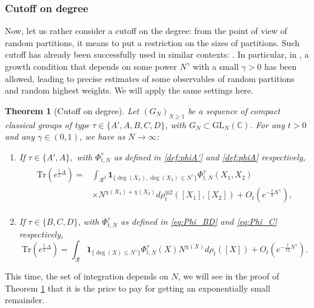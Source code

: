 \documentclass[11pt,a4paper,reqno]{article}
\newtheorem{theorem}{Theorem}[section]
\theoremstyle{definition}
\theoremstyle{remark}
\newcommand\GL{{\mathrm{GL}}}
\newcommand\C{\mathbb{C}}
\newcommand\Tr{\mathrm{Tr}}
\begin{document}
\subsubsection{Cutoff on degree}

Now, let us rather consider a cutoff on the degree: from the point of view of random partitions, it means to put a restriction on the sizes of partitions. Such cutoff has already been successfully used in similar contexts: \cite{Lem,Mag,Lem3}. In particular, in \cite{Lem,Lem3}, a growth condition that depends on some power $N^\gamma$ with a small $\gamma>0$ has been allowed, leading to precise estimates of some observables of random partitions and random highest weights. We will apply the same settings here.

\begin{theorem}[Cutoff on degree]\label{thm:main_alt}
Let $(G_N)_{N\geq 1}$ be a sequence of compact classical groups of type $\tau\in\{A',A,B,C,D\}$, with $G_N\subset\GL_N(\C)$. For any $t>0$ and any $\gamma\in(0,1)$, we have as $N\to\infty$:
\begin{enumerate}
\item If $\tau\in\{A',A\},$ with $\Phi_{t,N}^\tau$ as defined in \eqref{def:phiA'} and \eqref{def:phiA} respectively,
\begin{align}
\begin{split}
\Tr(e^{\frac{t}{2}\Delta}) = & \int_{\mathcal{R}^2}\mathbf{1}_{\{\deg(X_1),\deg(X_2)\leq N^\gamma\}}\Phi_{t,N}^\tau(X_1,X_2)\\
&\times N^{\chi(X_1)+\chi(X_2)}d\rho_t^{\otimes 2}([X_1],[X_2])+O_t(e^{-\frac{t}{8}N^\gamma}),
\end{split}
\end{align}
\item If $\tau\in\{B,C,D\}$, with $\Phi_{t,N}^\tau$ as defined in \eqref{eq:Phi_BD} and \eqref{eq:Phi_C} respectively,
\begin{equation}
\Tr(e^{\frac{t}{2}\Delta})=\int_{\mathcal{R}}\mathbf{1}_{\{\deg(X)\leq N^\gamma\}}\Phi_{t,N}^\tau(X)N^{\chi(X)}d\rho_t([X])+O_t(e^{-\frac{t}{12}N^\gamma}).
\end{equation}
\end{enumerate}

\end{theorem}

This time, the set of integration depends on $N$, we will see in the proof of Theorem \ref{thm:main_alt} that it is the price to pay for getting an exponentially small remainder.
\end{document}
